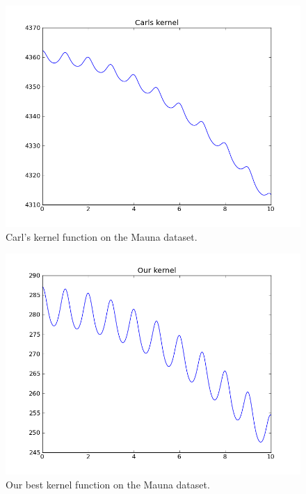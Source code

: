 \documentclass[twoside]{article}
\begin{document}
\begin{figure}
\includegraphics[width=\columnwidth]{../figures/carls_kernel}
\caption{Carl's kernel function on the Mauna dataset.}
\end{figure}

\begin{figure}
\includegraphics[width=\columnwidth]{../figures/our_kernel}
\caption{Our best kernel function on the Mauna dataset.}
\end{figure}
\end{document}
